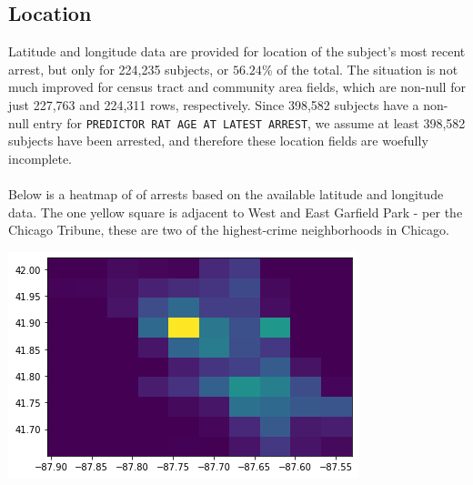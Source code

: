 \subsection{Location}
Latitude and longitude data are provided for location of the subject's most recent arrest, but only for 224,235 subjects, or $56.24$\% of the total. The situation is not much improved for census tract and community area fields, which are non-null for just 227,763 and 224,311 rows, respectively. Since 398,582 subjects have a non-null entry for \texttt{PREDICTOR RAT AGE AT LATEST ARREST}, we assume at least 398,582 subjects have been arrested, and therefore these location fields are woefully incomplete.\\\\
Below is a heatmap of of arrests based on the available latitude and longitude data. The one yellow square is adjacent to West and East Garfield Park - per the Chicago Tribune, these are two of the highest-crime neighborhoods in Chicago.\cite{crime}
\begin{center}
    \includegraphics[scale=.5]{images/locations.png}
\end{center}

